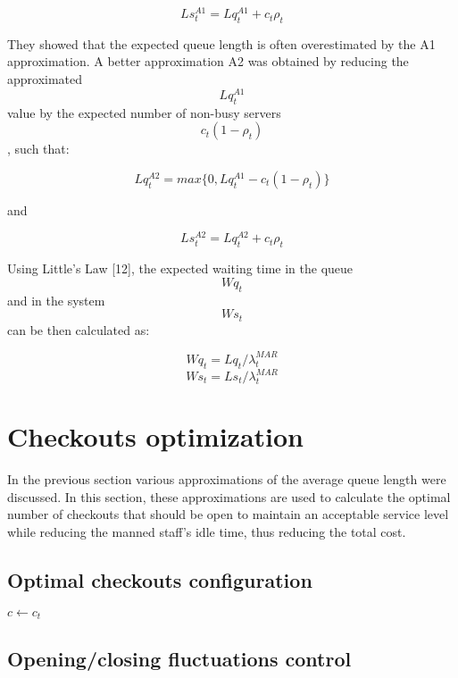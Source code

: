 $$ Ls_t^{A1} = Lq_t^{A1} + c_t \rho_t $$

They showed that the expected queue length is often overestimated by the A1 approximation. A better approximation A2 was obtained by reducing the approximated $$ Lq_t^{A1} $$ value by the expected number of non-busy servers $$ c_t (1 - \rho_t) $$, such that:

$$ Lq_t^{A2} = max\{0, Lq_t^{A1} - c_t (1 - \rho_t)\} $$

and

$$ Ls_t^{A2} = Lq_t^{A2} + c_t \rho_t $$

Using Little’s Law [12], the expected waiting time in the queue $$ Wq_t $$ and in the system $$ Ws_t $$ can be then calculated as:

$$ Wq_t = Lq_t / \lambda^{MAR}_t$$
$$ Ws_t = Ls_t / \lambda^{MAR}_t $$


\section{Checkouts optimization}
\label{sec:checkouts_optimization}
In the previous section various approximations of the average queue length were discussed. In this section, these approximations are used to calculate the optimal number of checkouts that should be open to maintain an acceptable service level while reducing the manned staff’s idle time, thus reducing the total cost.

\subsection{Optimal checkouts configuration}
\label{subsec:optimal_checkouts_configuration}

\begin{algorithm}[H]
  $ c \gets c_t$\;
\end{algorithm}


\subsection{Opening/closing fluctuations control}
\label{subsec:opening_closing_fluctuations_control}

\clearpage